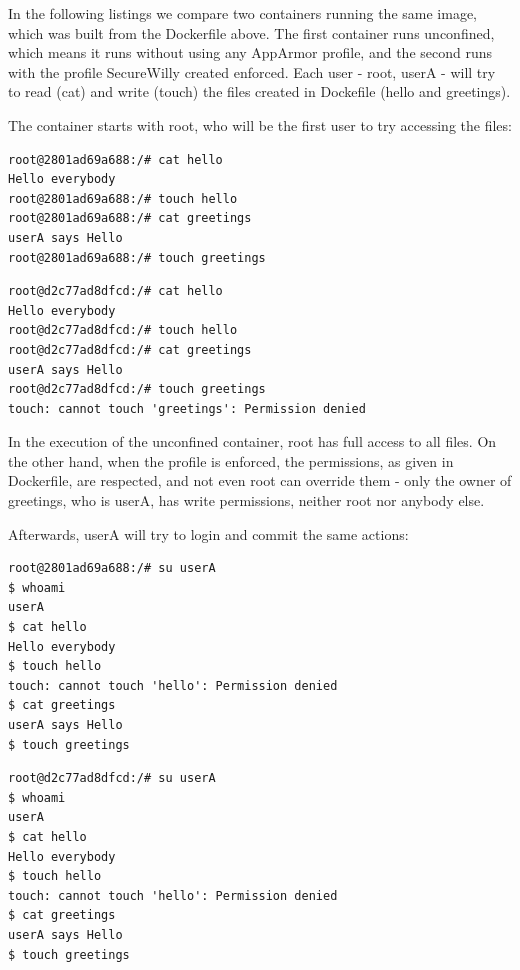 In the following listings we compare two containers running the same image, which was built from the Dockerfile above. The first container runs unconfined, which means it runs without using any AppArmor profile, and the second runs with the profile SecureWilly created enforced. Each user - root, userA - will try to read (cat) and write (touch) the files created in Dockefile (hello and greetings).

The container starts with root, who will be the first user to try accessing the files:

\noindent\begin{minipage}{.49\textwidth}
\begin{lstlisting}[caption=Unconfined,style=terminal]
root@2801ad69a688:/# cat hello
Hello everybody
root@2801ad69a688:/# touch hello
root@2801ad69a688:/# cat greetings 
userA says Hello
root@2801ad69a688:/# touch greetings
\end{lstlisting}
\end{minipage}\hfill
\begin{minipage}{.49\textwidth}
\begin{lstlisting}[caption=Profile enforced,style=terminal]
root@d2c77ad8dfcd:/# cat hello  
Hello everybody
root@d2c77ad8dfcd:/# touch hello 
root@d2c77ad8dfcd:/# cat greetings 
userA says Hello
root@d2c77ad8dfcd:/# touch greetings 
touch: cannot touch 'greetings': Permission denied
\end{lstlisting}
\end{minipage}

In the execution of the unconfined container, root has full access to all files. On the other hand, when the profile is enforced, the permissions, as given in Dockerfile, are respected, and not even root can override them - only the owner of greetings, who is userA, has write permissions, neither root nor anybody else. 

Afterwards, userA will try to login and commit the same actions:

\noindent\begin{minipage}{.49\textwidth}
\begin{lstlisting}[caption=Unconfined,style=terminal]
root@2801ad69a688:/# su userA
$ whoami
userA
$ cat hello
Hello everybody
$ touch hello
touch: cannot touch 'hello': Permission denied
$ cat greetings
userA says Hello
$ touch greetings
\end{lstlisting}
\end{minipage}\hfill
\begin{minipage}{.49\textwidth}
\begin{lstlisting}[caption=Profile enforced,style=terminal]
root@d2c77ad8dfcd:/# su userA
$ whoami
userA
$ cat hello
Hello everybody
$ touch hello
touch: cannot touch 'hello': Permission denied
$ cat greetings
userA says Hello
$ touch greetings
\end{lstlisting}
\end{minipage}

